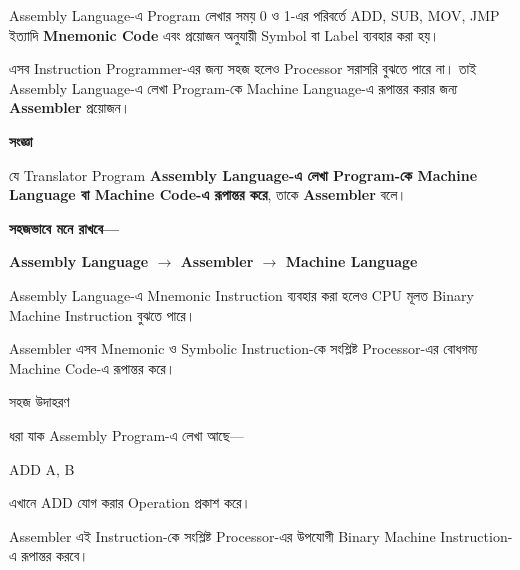 
Assembly Language-এ Program লেখার সময় 0 ও 1-এর পরিবর্তে
\textenglish{\ttfamily ADD, SUB, MOV, JMP} ইত্যাদি
\textbf{Mnemonic Code} এবং প্রয়োজন অনুযায়ী Symbol বা Label
ব্যবহার করা হয়।

এসব Instruction Programmer-এর জন্য সহজ হলেও Processor সরাসরি
বুঝতে পারে না। তাই Assembly Language-এ লেখা Program-কে
Machine Language-এ রূপান্তর করার জন্য \textbf{Assembler} প্রয়োজন।


\begin{definitionbox}

\textbf{\color{darkTeal}সংজ্ঞা}

যে Translator Program \textbf{Assembly Language-এ লেখা Program-কে
Machine Language বা Machine Code-এ রূপান্তর করে}, তাকে
\textbf{Assembler} বলে।

\end{definitionbox}

\textbf{সহজভাবে মনে রাখবে—}

\begin{center}

\textbf{
Assembly Language
\(\longrightarrow\)
Assembler
\(\longrightarrow\)
Machine Language
}

\end{center}


Assembly Language-এ Mnemonic Instruction ব্যবহার করা হলেও CPU
মূলত Binary Machine Instruction বুঝতে পারে।

Assembler এসব Mnemonic ও Symbolic Instruction-কে সংশ্লিষ্ট
Processor-এর বোধগম্য Machine Code-এ রূপান্তর করে।

\begin{examplebox}{সহজ উদাহরণ}

ধরা যাক Assembly Program-এ লেখা আছে—

\begin{center}
{\textenglish{\ttfamily ADD A, B}}
\end{center}

এখানে \textenglish{\ttfamily ADD} যোগ করার Operation প্রকাশ করে।

Assembler এই Instruction-কে সংশ্লিষ্ট Processor-এর উপযোগী
Binary Machine Instruction-এ রূপান্তর করবে।

\end{examplebox}

